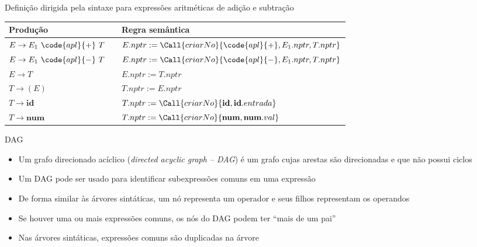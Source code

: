 \begin{frame}[fragile]{Definição dirigida pela sintaxe para expressões aritméticas de adição e subtração}

    \begin{table}
        \centering
        \begin{tabular}{lp{2cm}l}
        \toprule
        \textbf{Produção} & & \textbf{Regra semântica} \\
        \midrule
        $E\to E_1\ \code{apl}{+}\ T$ & & $E.nptr := \Call{criarNo}{\code{apl}{+}, E_1.nptr, T.nptr}$ \\
        \rowcolor[gray]{0.9}
        $E\to E_1\ \code{apl}{-}\ T$ & & $E.nptr := \Call{criarNo}{\code{apl}{-}, E_1.nptr, T.nptr}$ \\
        $E\to T$ & & $E.nptr := T.nptr$ \\
        \rowcolor[gray]{0.9}
        $T\to (E)$ & & $T.nptr := E.nptr$ \\
        $T\to \textbf{id}$ & & $T.nptr := \Call{criarNo}{\textbf{id}, \textbf{id}.entrada}$ \\
        \rowcolor[gray]{0.9}
        $T\to \textbf{num}$ & & $T.nptr := \Call{criarNo}{\textbf{num}, \textbf{num}.val}$ \\
        \bottomrule
        \end{tabular} 
    \end{table}

\end{frame}

\begin{frame}[fragile]{DAG}

    \begin{itemize}
        \item Um grafo direcionado acíclico (\textit{directed acyclic graph -- DAG}) é um grafo cujas arestas são direcionadas e que não possui ciclos
        \pause

        \item Um DAG pode ser usado para identificar subexpressões comuns em uma expressão
        \pause

        \item De forma similar às árvores sintáticas, um nó representa um operador e seus filhos representam os operandos
        \pause

        \item Se houver uma ou mais expressões comuns, os nós do DAG podem ter ``mais de um pai''
        \pause

        \item Nas árvores sintáticas, expressões comuns são duplicadas na árvore
    \end{itemize}

\end{frame}

